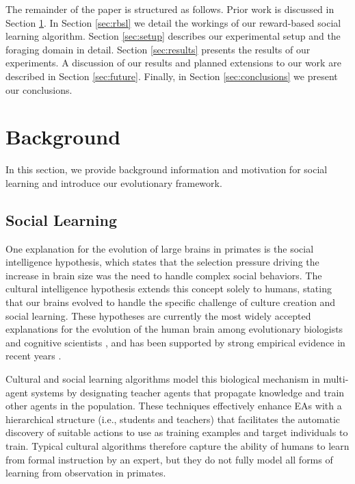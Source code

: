 \documentclass{acm_proc_article-sp}
\begin{document}
The remainder of the paper is structured as follows.
Prior work is discussed in Section \ref{sec:background}.
In Section \ref{sec:rbsl} we detail the workings of our reward-based social learning algorithm.
Section \ref{sec:setup} describes our experimental setup and the foraging domain in detail.
Section \ref{sec:results} presents the results of our experiments.
A discussion of our results and planned extensions to our work are described in Section \ref{sec:future}.
Finally, in Section \ref{sec:conclusions} we present our conclusions.

\section{Background}
\label{sec:background}
In this section, we provide background information and motivation for social learning and introduce our evolutionary framework.

\subsection*{Social Learning}

One explanation for the evolution of large brains in primates is the social intelligence hypothesis, which states that the selection pressure driving the increase in brain size was the need to handle complex social behaviors. The cultural intelligence hypothesis extends this concept solely to humans, stating that our brains evolved to handle the specific challenge of culture creation and social learning. These hypotheses are currently the most widely accepted explanations for the evolution of the human brain among evolutionary biologists and cognitive scientists \cite{holekamp2007questioning}, and has been supported by strong empirical evidence in recent years \cite{herrmann2007humans}.

Cultural and social learning algorithms \cite{reynolds1994introduction} model this biological mechanism in multi-agent systems by designating teacher agents that propagate knowledge and train other agents in the population. These techniques effectively enhance EAs with a hierarchical structure (i.e., students and teachers) that facilitates the automatic discovery of suitable actions to use as training examples and target individuals to train. Typical cultural algorithms therefore capture the ability of humans to learn from formal instruction by an expert, but they do not fully model all forms of learning from observation in primates.
\end{document}
